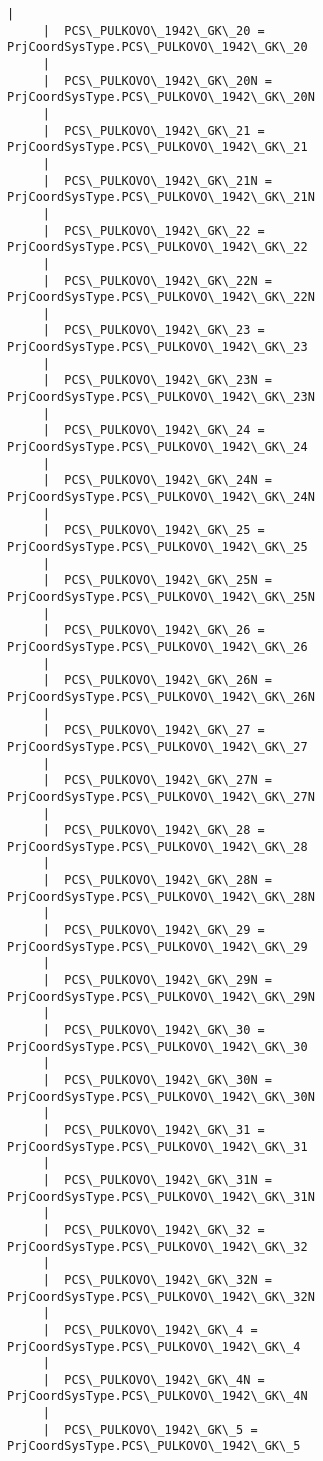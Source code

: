 \documentclass[11pt]{article}
\begin{document}
\begin{Verbatim}[commandchars=\\\{\}]
     |  
     |  PCS\_PULKOVO\_1942\_GK\_20 = PrjCoordSysType.PCS\_PULKOVO\_1942\_GK\_20
     |  
     |  PCS\_PULKOVO\_1942\_GK\_20N = PrjCoordSysType.PCS\_PULKOVO\_1942\_GK\_20N
     |  
     |  PCS\_PULKOVO\_1942\_GK\_21 = PrjCoordSysType.PCS\_PULKOVO\_1942\_GK\_21
     |  
     |  PCS\_PULKOVO\_1942\_GK\_21N = PrjCoordSysType.PCS\_PULKOVO\_1942\_GK\_21N
     |  
     |  PCS\_PULKOVO\_1942\_GK\_22 = PrjCoordSysType.PCS\_PULKOVO\_1942\_GK\_22
     |  
     |  PCS\_PULKOVO\_1942\_GK\_22N = PrjCoordSysType.PCS\_PULKOVO\_1942\_GK\_22N
     |  
     |  PCS\_PULKOVO\_1942\_GK\_23 = PrjCoordSysType.PCS\_PULKOVO\_1942\_GK\_23
     |  
     |  PCS\_PULKOVO\_1942\_GK\_23N = PrjCoordSysType.PCS\_PULKOVO\_1942\_GK\_23N
     |  
     |  PCS\_PULKOVO\_1942\_GK\_24 = PrjCoordSysType.PCS\_PULKOVO\_1942\_GK\_24
     |  
     |  PCS\_PULKOVO\_1942\_GK\_24N = PrjCoordSysType.PCS\_PULKOVO\_1942\_GK\_24N
     |  
     |  PCS\_PULKOVO\_1942\_GK\_25 = PrjCoordSysType.PCS\_PULKOVO\_1942\_GK\_25
     |  
     |  PCS\_PULKOVO\_1942\_GK\_25N = PrjCoordSysType.PCS\_PULKOVO\_1942\_GK\_25N
     |  
     |  PCS\_PULKOVO\_1942\_GK\_26 = PrjCoordSysType.PCS\_PULKOVO\_1942\_GK\_26
     |  
     |  PCS\_PULKOVO\_1942\_GK\_26N = PrjCoordSysType.PCS\_PULKOVO\_1942\_GK\_26N
     |  
     |  PCS\_PULKOVO\_1942\_GK\_27 = PrjCoordSysType.PCS\_PULKOVO\_1942\_GK\_27
     |  
     |  PCS\_PULKOVO\_1942\_GK\_27N = PrjCoordSysType.PCS\_PULKOVO\_1942\_GK\_27N
     |  
     |  PCS\_PULKOVO\_1942\_GK\_28 = PrjCoordSysType.PCS\_PULKOVO\_1942\_GK\_28
     |  
     |  PCS\_PULKOVO\_1942\_GK\_28N = PrjCoordSysType.PCS\_PULKOVO\_1942\_GK\_28N
     |  
     |  PCS\_PULKOVO\_1942\_GK\_29 = PrjCoordSysType.PCS\_PULKOVO\_1942\_GK\_29
     |  
     |  PCS\_PULKOVO\_1942\_GK\_29N = PrjCoordSysType.PCS\_PULKOVO\_1942\_GK\_29N
     |  
     |  PCS\_PULKOVO\_1942\_GK\_30 = PrjCoordSysType.PCS\_PULKOVO\_1942\_GK\_30
     |  
     |  PCS\_PULKOVO\_1942\_GK\_30N = PrjCoordSysType.PCS\_PULKOVO\_1942\_GK\_30N
     |  
     |  PCS\_PULKOVO\_1942\_GK\_31 = PrjCoordSysType.PCS\_PULKOVO\_1942\_GK\_31
     |  
     |  PCS\_PULKOVO\_1942\_GK\_31N = PrjCoordSysType.PCS\_PULKOVO\_1942\_GK\_31N
     |  
     |  PCS\_PULKOVO\_1942\_GK\_32 = PrjCoordSysType.PCS\_PULKOVO\_1942\_GK\_32
     |  
     |  PCS\_PULKOVO\_1942\_GK\_32N = PrjCoordSysType.PCS\_PULKOVO\_1942\_GK\_32N
     |  
     |  PCS\_PULKOVO\_1942\_GK\_4 = PrjCoordSysType.PCS\_PULKOVO\_1942\_GK\_4
     |  
     |  PCS\_PULKOVO\_1942\_GK\_4N = PrjCoordSysType.PCS\_PULKOVO\_1942\_GK\_4N
     |  
     |  PCS\_PULKOVO\_1942\_GK\_5 = PrjCoordSysType.PCS\_PULKOVO\_1942\_GK\_5

\end{Verbatim}
\end{document}
